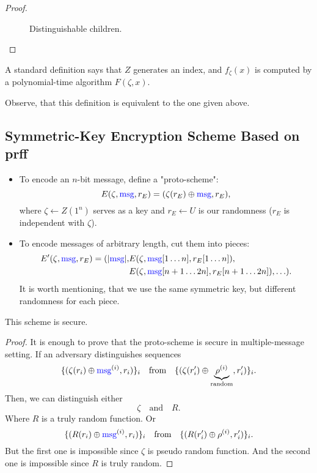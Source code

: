 \begin{proof}
\begin{figure}[htpb]
\begin{tikzpicture}[
  level 1/.style={sibling distance=120mm},
  level 2/.style={sibling distance=60mm},
  level 3/.style={sibling distance=30mm},
  every node/.style={text height=2ex, text depth=.5ex},
  scale=0.8
]
\end{tikzpicture}
		\caption{Distinguishable children.}
		\label{fig:distinguishable_children}
	\end{figure}

\end{proof}
\begin{remark}
A standard definition says that $Z$ generates an index, and  $f_{\zeta}(x)$ is computed by a polynomial-time algorithm $F(\zeta, x)$.
\end{remark}
\begin{exercise}
	Observe, that this definition is equivalent to the one given above.
\end{exercise}

\subsection{Symmetric-Key Encryption Scheme Based on prff}

\begin{itemize}
	\item To encode an $n$-bit message, define a "proto-scheme":
		 \[
		E(\zeta, \msg, r_E) = (\zeta(r_E) \oplus \msg, r_E)
		,\] 
		where $\zeta \gets Z(1^{n})$ serves as a key and $r_E \gets U$ is our randomness ($r_E$ is independent with $\zeta$).

	\item To encode messages of arbitrary length, cut them into pieces:
		\begin{align*}
			E'(\zeta, \msg, r_E) = (|\msg|, &E(\zeta, \msg[1\ldots n], r_E[1 \ldots n]), \\
										&E(\zeta, \msg[n + 1 \ldots 2n], r_E[n + 1 \ldots 2n]), \ldots)
		.\end{align*}
		It is worth mentioning, that we use the same symmetric key, but different randomness for each piece.
\end{itemize}
\begin{lemma}
	This scheme is secure.
\end{lemma}
\begin{proof}
	It is enough to prove that the proto-scheme is secure in multiple-message setting.
	If an adversary distinguishes sequences
	\[
		\{(\zeta(r_i) \oplus \msg^{(i)}, r_i)\}_{i} \quad \text{from} \quad \{(\zeta(r_i') \oplus \underbrace{\rho^{(i)}}_{\text{random}}, r_i')\}_{i} 
	.\] 
	Then, we can distinguish either
	\[
		\zeta \quad \text{and} \quad R
	.\] Where $R$ is a truly random function.
	Or
	\[
		\{(R(r_i) \oplus \msg^{(i)}, r_i)\}_{i} \quad \text{from} \quad \{(R(r_i') \oplus \rho^{(i)}, r_i')\}_{i} 
	.\] 
	But the first one is impossible since $\zeta$ is pseudo random function.
	And the second one is impossible since $R$ is truly random.
\end{proof}



